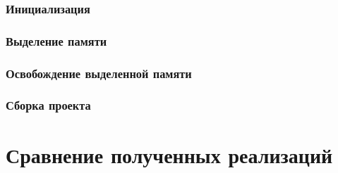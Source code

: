 \documentclass[bachelor, och, otchet]{SCWorks}
\begin{document}
\subsubsection{Инициализация}


\subsubsection{Выделение памяти}


\subsubsection{Освобождение выделенной памяти}


\subsubsection{Сборка проекта}


\section{Сравнение полученных реализаций}


\conclusion


%

%





\appendix 

\end{document}
